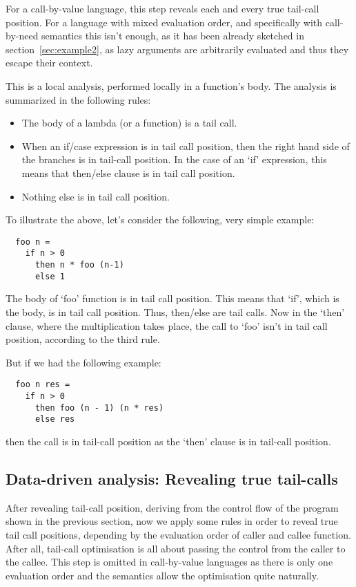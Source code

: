 \documentclass[diploma]{softlab-thesis}
\begin{document}
For a call-by-value language, this step reveals each and every true tail-call position. For a language with mixed evaluation order, and specifically 
with call-by-need semantics this isn't enough, as it has been already sketched in section~\ref{sec:example2}, as lazy arguments are arbitrarily evaluated and thus 
they escape their context. 

This is a local analysis, performed locally in a function's body. The analysis is summarized in the following rules:
\begin{itemize}
  \item The body of a lambda (or a function) is a tail call.
  \item When an if/case expression is in tail call position, then the right hand side of the branches is in tail-call position. 
  In the case of an `if' expression, this means that then/else clause is in tail call position.
  \item Nothing else is in tail call position.
\end{itemize}

To illustrate the above, let's consider the following, very simple example:
\begin{verbatim}
  foo n = 
    if n > 0  
      then n * foo (n-1) 
      else 1
\end{verbatim}

The body of `foo' function is in tail call position. This means that `if', which is the body, is in tail call position. 
Thus, then/else are tail calls. Now in the `then' clause, where the multiplication takes place, the call to `foo' isn't in tail call position, 
according to the third rule.

But if we had the following example:
\begin{verbatim}
  foo n res = 
    if n > 0 
      then foo (n - 1) (n * res)
      else res
\end{verbatim}
then the call is in tail-call position as the `then' clause is in tail-call position.

\subsection{Data-driven analysis: Revealing true tail-calls}
\label{sec:data-driven-analysis}

After revealing tail-call position, deriving from the control flow of the program shown in the previous section, now we apply some rules in order to 
reveal true tail call positions, depending by the evaluation order of caller and callee function. After all, tail-call optimisation 
is all about passing the control from the caller to the callee. This step is omitted in call-by-value languages as there is 
only one evaluation order and the semantics allow the optimisation quite naturally.
\end{document}
